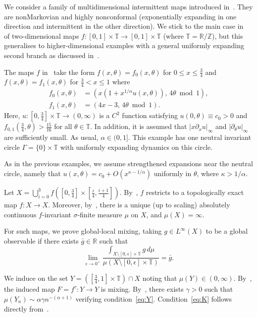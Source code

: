 \documentclass[12pt]{article}
\numberwithin{equation}{section}
\newcommand{\R}{{\mathbb R}}
\newcommand{\T}{{\mathbb T}}
\newcommand{\Z}{{\mathbb Z}}
\newcommand{\eps}{\epsilon}
\begin{document}
\begin{example} \label{ex:EMV}
We consider a family of multidimensional intermittent maps
introduced in~\cite{EMV21}.
They are nonMarkovian and highly nonconformal (exponentially expanding in one direction and intermittent in the other direction).
We stick to the main case in~\cite{EMV21} of two-dimensional maps
$f:[0,1]\times\T\to[0,1]\times\T$ (where $\T=\R/\Z$), but this generalises to higher-dimensional examples with a general uniformly expanding second branch as discussed in~\cite[Remark~1.7]{EMV21}.

The maps $f$ in~\cite{EMV21} take the form 
$f(x,\theta)=f_0(x,\theta)$ for $0\le x\le \frac34$ and 
$f(x,\theta)=f_1(x,\theta)$ for $\frac34<x\le1$ where
\begin{align*}
f_0(x,\theta) & = (x(1+x^{1/\alpha}u(x,\theta)),\,4\theta\bmod1), \\
f_1(x,\theta) & = (4x-3,\,4\theta\bmod1) .
\end{align*}
Here, $u:[0,\frac34]\times\T\to(0,\infty)$ is a $C^2$ function satisfying
$u(0,\theta)\equiv c_0>0$ and $f_{0,1}(\frac34,\theta)>\frac{15}{16}$ for all $\theta\in\T$. In addition, it is assumed that $|x\partial_x u|_\infty$ and
$|\partial_\theta u|_\infty$ are sufficiently small. As usual, $\alpha\in(0,1]$.
This example has one neutral invariant circle $\Gamma=\{0\}\times \T$ with uniformly expanding dynamics on this circle.

As in the previous examples, we assume strengthened expansions near the neutral circle, namely that $u(x,\theta)=c_0+O(x^{\kappa-1/\alpha})$ uniformly in $\theta$, where $\kappa>1/\alpha$.

Let $X=\bigcup_{i=0}^3 f([0,\tfrac34]\times[\tfrac{i}{4},\tfrac{i+1}{4}])$.
By~\cite[Proposition~2.2]{EMV21}, $f$ restricts to a topologically exact map $f:X\to X$.
Moreover, by~\cite[Lemma~3.4]{EMV21}, there is a unique (up to scaling) absolutely continuous $f$-invariant $\sigma$-finite measure $\mu$ on $X$, and $\mu(X)=\infty$. 

For such maps, we prove global-local mixing, taking
$g\in L^\infty(X)$ to be a global observable if
there exists $\bar g\in\R$ such that
\[
\lim_{\eps\to0^+}\frac{\int_{X\setminus[0,\eps]\times\T}g\,d\mu}{
\mu(X\setminus[0,\eps]\times\T)}=\bar g.
\]


We induce on the set $Y=([\tfrac34,1]\times\T)\cap X$ noting that $\mu(Y)\in(0,\infty)$.
By~\cite[Lemma~3.2]{EMV21}, the induced map $F=f^\tau:Y\to Y$ is  mixing.
By~\cite[Proposition~4.11]{EMV21}, there exists $\gamma>0$ such that
$\mu(Y_n)\sim \alpha\gamma n^{-(\alpha+1)}$ verifying
condition~\eqref{eq:Y}.
Condition~\eqref{eq:K} follows directly from~\cite[Theorem~1.5(a)]{EMV21}.


\end{example}
\end{document}
